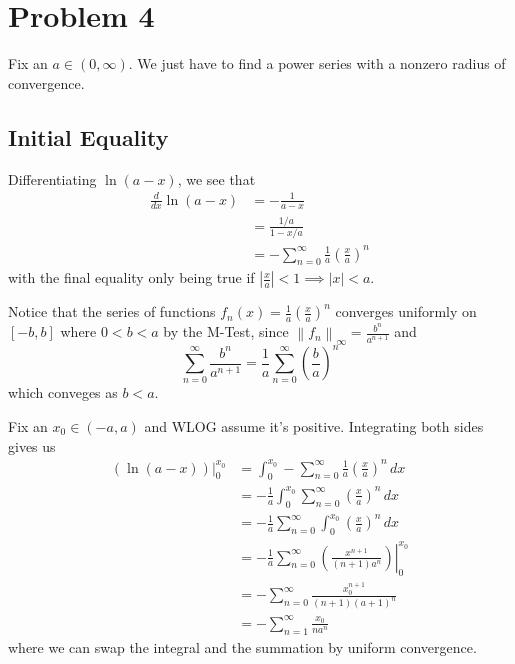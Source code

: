 \documentclass[12pt]{article}
\newcommand{\norm}[1]{\left\lVert#1\right\rVert}
\begin{document}
\setcounter{section}{3}

\section{Problem 4}

Fix an $a \in (0, \infty)$.
We just have to find a power series with a nonzero radius of convergence.

\subsection{Initial Equality}

Differentiating $\ln (a-x)$, we see that
\begin{align*}
    \frac{d}{dx} \ln (a-x)
     & = -\frac{1}{a-x}                                             \\
     & = \frac{1/a}{1-x/a}                                          \\
     & = -\sum_{n=0}^{\infty} \frac{1}{a}\left(\frac{x}{a}\right)^n
\end{align*}
with the final equality only being true if $\left|\frac{x}{a}\right| < 1 \implies |x| < a$.

Notice that the series of functions $f_n(x)=\frac{1}{a}\left(\frac{x}{a}\right)^n$ converges
uniformly on $[-b, b]$ where $0 < b < a$ by the M-Test, since $\norm{f_n}_\infty=\frac{b^n}{a^{n+1}}$ and
\[\sum_{n=0}^{\infty} \frac{b^n}{a^{n+1}}=\frac{1}{a} \sum_{n=0}^{\infty} \left(\frac{b}{a}\right)^n\]
which conveges as $b < a$.

Fix an $x_0 \in (-a, a)$ and WLOG assume it's positive.
Integrating both sides gives us
\begin{align*}
    \left.\left(\ln(a-x)\right)\right|^{x_0}_0
     & = \int_{0}^{x_0} -\sum_{n=0}^{\infty} \frac{1}{a}\left(\frac{x}{a}\right)^n\,dx                 \\
     & = -\frac{1}{a} \int_{0}^{x_0} \sum_{n=0}^{\infty} \left(\frac{x}{a}\right)^n\,dx                \\
     & = -\frac{1}{a} \sum_{n=0}^{\infty} \int_{0}^{x_0} \left(\frac{x}{a}\right)^n\,dx                \\
     & = -\frac{1}{a} \sum_{n=0}^{\infty} \left.\left(\frac{x^{n+1}}{(n+1)a^n}\right)\right|^{x_0}_{0} \\
     & = - \sum_{n=0}^{\infty} \frac{x_0^{n+1}}{(n+1)(a+1)^n}                                          \\
     & = -\sum_{n=1}^{\infty} \frac{x_0}{n a^n}
\end{align*}
where we can swap the integral and the summation by uniform convergence.
\end{document}
